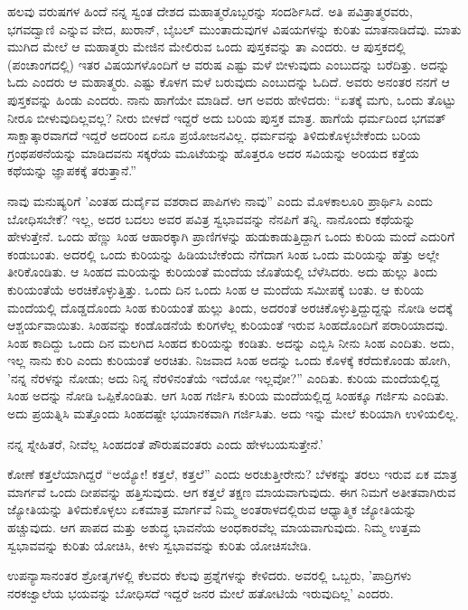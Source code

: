 ಹಲವು ವರುಷಗಳ ಹಿಂದೆ ನನ್ನ ಸ್ವಂತ ದೇಶದ ಮಹಾತ್ಮರೊಬ್ಬರನ್ನು ಸಂದರ್ಶಿಸಿದೆ. ಅತಿ ಪವಿತ್ರಾತ್ಮರವರು, ಭಗವದ್ವಾಣಿ ಎನ್ನುವ ವೇದ, ಖುರಾನ್, ಬೈಬಲ್ ಮುಂತಾದುವುಗಳ ವಿಷಯಗಳನ್ನು ಕುರಿತು ಮಾತನಾಡಿದೆವು. ಮಾತು ಮುಗಿದ ಮೇಲೆ ಆ ಮಹಾತ್ಮರು ಮೇಜಿನ ಮೇಲಿರುವ ಒಂದು ಪುಸ್ತಕವನ್ನು ತಾ ಎಂದರು. ಆ ಪುಸ್ತಕದಲ್ಲಿ (ಪಂಚಾಂಗದಲ್ಲಿ) ಇತರ ವಿಷಯಗಳೊಂದಿಗೆ ಆ ವರುಷ ಎಷ್ಟು ಮಳೆ ಬೀಳುವುದು ಎಂಬುದನ್ನು ಬರೆದಿತ್ತು. ಅದನ್ನು ಓದು ಎಂದರು ಆ ಮಹಾತ್ಮರು. ಎಷ್ಟು ಕೊಳಗ ಮಳೆ ಬರುವುದು ಎಂಬುದನ್ನು ಓದಿದೆ. ಅವರು ಅನಂತರ ನನಗೆ ಆ ಪುಸ್ತಕವನ್ನು ಹಿಂಡು ಎಂದರು. ನಾನು ಹಾಗೆಯೇ ಮಾಡಿದೆ. ಆಗ ಅವರು ಹೇಳಿದರು: “ಏತಕ್ಕೆ ಮಗು, ಒಂದು ತೊಟ್ಟು ನೀರೂ ಬೀಳುವುದಿಲ್ಲವಲ್ಲ? ನೀರು ಬೀಳದೆ ಇದ್ದರೆ ಅದು ಬರಿಯ ಪುಸ್ತಕ ಮಾತ್ರ. ಹಾಗೆಯೆ ಧರ್ಮದಿಂದ ಭಗವತ್ ಸಾಕ್ಷಾತ್ಕಾರವಾಗದೆ ಇದ್ದರೆ ಅದರಿಂದ ಏನೂ ಪ್ರಯೋಜನವಿಲ್ಲ. ಧರ್ಮವನ್ನು ತಿಳಿದುಕೊಳ್ಳಬೇಕೆಂದು ಬರಿಯ ಗ್ರಂಥಪಠನೆಯನ್ನು ಮಾಡಿದವನು ಸಕ್ಕರೆಯ ಮೂಟೆಯನ್ನು ಹೊತ್ತರೂ ಅದರ ಸವಿಯನ್ನು ಅರಿಯದ ಕತ್ತೆಯ ಕಥೆಯನ್ನು ಜ್ಞಾಪಕಕ್ಕೆ ತರುತ್ತಾನೆ.”

ನಾವು ಮನುಷ್ಯರಿಗೆ 'ಎಂತಹ ದುರ್ದೈವ ವಶರಾದ ಪಾಪಿಗಳು ನಾವು'' ಎಂದು ಮೊಳಕಾಲೂರಿ ಪ್ರಾರ್ಥಿಸಿ ಎಂದು ಬೋಧಿಸಬೇಕೆ? ಇಲ್ಲ, ಅದರ ಬದಲು ಅವರ ಪವಿತ್ರ ಸ್ವಭಾವವನ್ನು ನೆನಪಿಗೆ ತನ್ನಿ. ನಾನೊಂದು ಕಥೆಯನ್ನು ಹೇಳುತ್ತೇನೆ. ಒಂದು ಹೆಣ್ಣು ಸಿಂಹ ಆಹಾರಕ್ಕಾಗಿ ಪ್ರಾಣಿಗಳನ್ನು ಹುಡುಕಾಡುತ್ತಿದ್ದಾಗ ಒಂದು ಕುರಿಯ ಮಂದೆ ಎದುರಿಗೆ ಕಂಡುಬಂತು. ಅದರಲ್ಲಿ ಒಂದು ಕುರಿಯನ್ನು ಹಿಡಿಯಬೇಕೆಂದು ನೆಗೆದಾಗ ಸಿಂಹ ಒಂದು ಮರಿಯನ್ನು ಹೆತ್ತು ಅಲ್ಲೇ ತೀರಿಕೊಂಡಿತು. ಆ ಸಿಂಹದ ಮರಿಯನ್ನು ಕುರಿಯಂತೆ ಮಂದೆಯ ಜೊತೆಯಲ್ಲಿ ಬೆಳೆಸಿದರು. ಅದು ಹುಲ್ಲು ತಿಂದು ಕುರಿಯಂತೆಯೆ ಅರಚಿಕೊಳ್ಳುತ್ತಿತ್ತು. ಒಂದು ದಿನ ಒಂದು ಸಿಂಹ ಆ ಮಂದೆಯ ಸಮೀಪಕ್ಕೆ ಬಂತು. ಆ ಕುರಿಯ ಮಂದೆಯಲ್ಲಿ ದೊಡ್ಡದೊಂದು ಸಿಂಹ ಕುರಿಯಂತೆ ಹುಲ್ಲು ತಿಂದು, ಅದರಂತೆ ಅರಚಿಕೊಳ್ಳುತ್ತಿದ್ದುದ್ದನ್ನು ನೋಡಿ ಅದಕ್ಕೆ ಆಶ್ಚರ್ಯವಾಯಿತು. ಸಿಂಹವನ್ನು ಕಂಡೊಡನೆಯೆ ಕುರಿಗಳೆಲ್ಲ ಕುರಿಯಂತೆ ಇರುವ ಸಿಂಹದೊಂದಿಗೆ ಪರಾರಿಯಾದವು. ಸಿಂಹ ಕಾದಿದ್ದು ಒಂದು ದಿನ ಮಲಗಿದ ಸಿಂಹದ ಕುರಿಯನ್ನು ಕಂಡಿತು. ಅದನ್ನು ಎಬ್ಬಿಸಿ ನೀನು ಸಿಂಹ ಎಂದಿತು. ಅದು, ಇಲ್ಲ ನಾನು ಕುರಿ ಎಂದು ಕುರಿಯಂತೆ ಅರಚಿತು. ನಿಜವಾದ ಸಿಂಹ ಅದನ್ನು ಒಂದು ಕೊಳಕ್ಕೆ ಕರೆದುಕೊಂಡು ಹೋಗಿ, 'ನನ್ನ ನೆರಳನ್ನು ನೋಡು; ಅದು ನಿನ್ನ ನೆರಳಿನಂತೆಯೆ ಇದೆಯೋ ಇಲ್ಲವೋ?'' ಎಂದಿತು. ಕುರಿಯ ಮಂದೆಯಲ್ಲಿದ್ದ ಸಿಂಹ ಅದನ್ನು ನೋಡಿ ಒಪ್ಪಿಕೊಂಡಿತು. ಆಗ ಸಿಂಹ ಗರ್ಜಿಸಿ ಕುರಿಯ ಮಂದೆಯಲ್ಲಿದ್ದ ಸಿಂಹಕ್ಕೂ ಗರ್ಜಿಸು ಎಂದಿತು. ಅದು ಪ್ರಯತ್ನಿಸಿ ಮತ್ತೊಂದು ಸಿಂಹದಷ್ಟೇ ಭಯಾನಕವಾಗಿ ಗರ್ಜಿಸಿತು. ಅದು ಇನ್ನು ಮೇಲೆ ಕುರಿಯಾಗಿ ಉಳಿಯಲಿಲ್ಲ.

ನನ್ನ ಸ್ನೇಹಿತರೆ, ನೀವೆಲ್ಲ ಸಿಂಹದಂತೆ ಪೌರುಷವಂತರು ಎಂದು ಹೇಳಬಯಸುತ್ತೇನೆ.'

ಕೋಣೆ ಕತ್ತಲೆಯಾಗಿದ್ದರೆ “ಅಯ್ಯೋ! ಕತ್ತಲೆ, ಕತ್ತಲೆ'' ಎಂದು ಅರಚುತ್ತೀರೇನು? ಬೆಳಕನ್ನು ತರಲು ಇರುವ ಏಕ ಮಾತ್ರ ಮಾರ್ಗವೆ ಒಂದು ದೀಪವನ್ನು ಹತ್ತಿಸುವುದು. ಆಗ ಕತ್ತಲೆ ತಕ್ಷಣ ಮಾಯವಾಗುವುದು. ಈಗ ನಿಮಗೆ ಅತೀತವಾಗಿರುವ ಜ್ಯೋತಿಯನ್ನು ತಿಳಿದುಕೊಳ್ಳಲು ಏಕಮಾತ್ರ ಮಾರ್ಗವೆ ನಿಮ್ಮ ಅಂತರಾಳದಲ್ಲಿರುವ ಆಧ್ಯಾತ್ಮಿಕ ಜ್ಯೋತಿಯನ್ನು ಹಚ್ಚುವುದು. ಆಗ ಪಾಪದ ಮತ್ತು ಅಶುದ್ಧ ಭಾವನೆಯ ಅಂಧಕಾರವೆಲ್ಲ ಮಾಯವಾಗುವುದು. ನಿಮ್ಮ ಉತ್ತಮ ಸ್ವಭಾವವನ್ನು ಕುರಿತು ಯೋಚಿಸಿ, ಕೀಳು ಸ್ವಭಾವವನ್ನು ಕುರಿತು ಯೋಚಿಸಬೇಡಿ.

\delimiter

ಉಪನ್ಯಾಸಾನಂತರ ಶ್ರೋತೃಗಳಲ್ಲಿ ಕೆಲವರು ಕೆಲವು ಪ್ರಶ್ನೆಗಳನ್ನು ಕೇಳಿದರು. ಅವರಲ್ಲಿ ಒಬ್ಬರು, 'ಪಾದ್ರಿಗಳು ನರಕಜ್ವಾಲೆಯ ಭಯವನ್ನು ಬೋಧಿಸದೆ ಇದ್ದರೆ ಜನರ ಮೇಲೆ ಹತೋಟಿಯೆ ಇರುವುದಿಲ್ಲ' ಎಂದರು.

